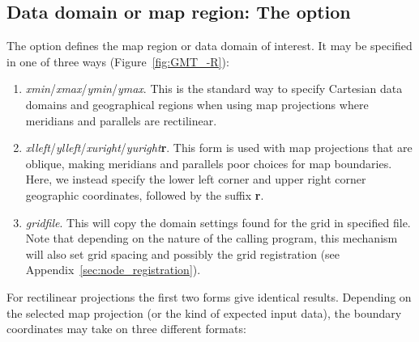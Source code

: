 \subsection{Data domain or map region: The  option}
\label{sec:R}

The  option defines the map region or data domain of interest.  It may be specified
in one of three ways (Figure~\ref{fig:GMT_-R}):
\begin{enumerate}
\item {}\emph{xmin}/\emph{xmax}/\emph{ymin}/\emph{ymax}.  This is the standard way to specify
Cartesian data domains and geographical regions when using map projections where meridians and
parallels are rectilinear.
\item {}\emph{xlleft}/\emph{ylleft}/\emph{xuright}/\emph{yuright}\textbf{r}.
This form is used with map projections that are oblique, making meridians and parallels poor
choices for map boundaries.  Here, we instead specify the lower left corner and upper right
corner geographic coordinates, followed by the suffix \textbf{r}.
\item {}\emph{gridfile}.  This will copy the domain settings found for the grid in specified
file.  Note that depending on the nature of the calling program, this mechanism will also set grid spacing
and possibly the grid registration (see Appendix~\ref{sec:node_registration}).
\end{enumerate}
For rectilinear projections the first two forms give identical results.  Depending on the selected map
projection (or the kind of expected input data), the boundary coordinates may take on three different
formats:

